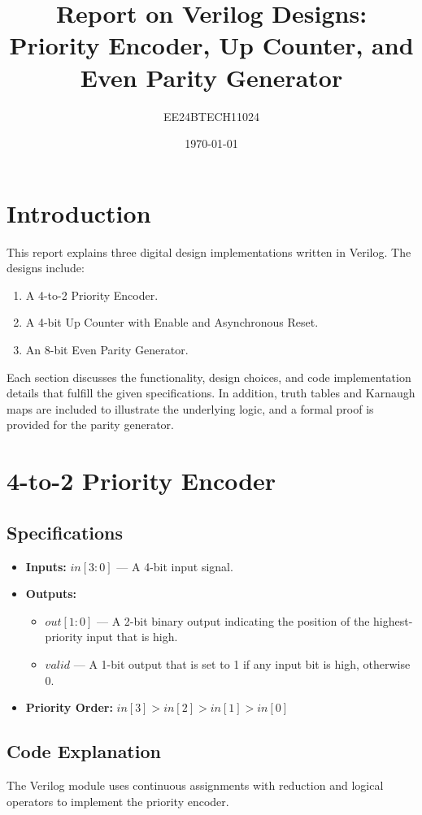 \documentclass[11pt]{article}
\title{Report on Verilog Designs: Priority Encoder, Up Counter, and Even Parity Generator}
\author{EE24BTECH11024}
\date{\today}
\begin{document}
\maketitle

\section{Introduction}
This report explains three digital design implementations written in Verilog. The designs include:
\begin{enumerate}
    \item A 4-to-2 Priority Encoder.
    \item A 4-bit Up Counter with Enable and Asynchronous Reset.
    \item An 8-bit Even Parity Generator.
\end{enumerate}
Each section discusses the functionality, design choices, and code implementation details that fulfill the given specifications. In addition, truth tables and Karnaugh maps are included to illustrate the underlying logic, and a formal proof is provided for the parity generator.

\section{4-to-2 Priority Encoder}

\subsection{Specifications}
\begin{itemize}
    \item \textbf{Inputs:} \({in[3:0]}\) --- A 4-bit input signal.
    \item \textbf{Outputs:}
    \begin{itemize}
        \item \({out[1:0]}\) --- A 2-bit binary output indicating the position of the highest-priority input that is high.
        \item \({valid}\) --- A 1-bit output that is set to 1 if any input bit is high, otherwise 0.
    \end{itemize}
    \item \textbf{Priority Order:} \({in[3] > in[2] > in[1] > in[0]}\)
\end{itemize}

\subsection{Code Explanation}
The Verilog module uses continuous assignments with reduction and logical operators to implement the priority encoder.
\end{document}

